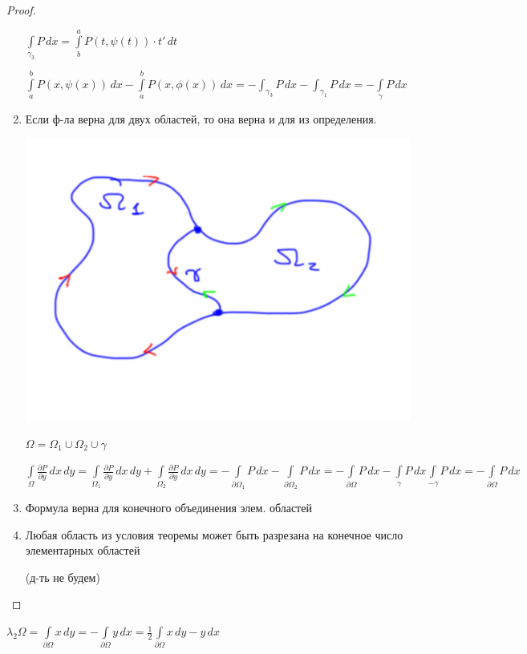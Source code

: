 \begin{proof}
\begin{enumerate}[Шаг 1.]
		$\int\limits_{\gamma_3} P\,dx = \int\limits_{b}^{a} P(t, \psi(t)) \cdot t' \,dt$
		
		$\int\limits_a^b P(x, \psi(x)) \,dx -\int\limits_a^b P(x, \phi(x)) \,dx = -\int_{\gamma_3} P\,dx -\int_{\gamma_1} P\,dx = -\int\limits_\gamma P \,dx$

		\item
		Если ф-ла верна для двух областей, то она верна и для из определения. 
		
		\includegraphics[scale=0.5]{pic_2}
		
		$\Omega = \Omega_1 \cup \Omega_2 \cup \gamma$
		
		$\int\limits_\Omega \frac{\partial P}{\partial y}\,dx\,dy = \int\limits_{\Omega_1} \frac{\partial P}{\partial y}\,dx\,dy + \int\limits_{\Omega_2} \frac{\partial P}{\partial y}\,dx\,dy = -\int\limits_{\partial \Omega_1} P \,dx -\int\limits_{\partial \Omega_2} P \,dx = -\int\limits_{\partial \Omega} P \,dx - \int\limits_{\gamma} P \,dx \int\limits_{-\gamma} P \,dx = -\int\limits_{\partial \Omega} P \,dx $

		\item
		Формула верна для конечного объединения элем. областей
		
		\item
		Любая область из условия теоремы может быть разрезана на конечное число элементарных областей
		
		(д-ть не будем)

	\end{enumerate}
\end{proof}

\begin{consequence}\thmslashn

	$\lambda_2 \Omega = \int\limits_{\partial \Omega} x \,dy = - \int\limits_{\partial \Omega} y \,dx = \frac{1}{2} \int\limits_{\partial \Omega} x \,dy - y \,dx $

\end{consequence}

